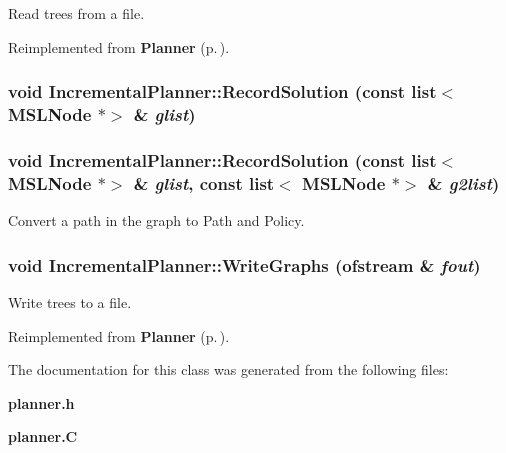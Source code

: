 Read trees from a file.



Reimplemented from {\bf Planner} {\rm (p.\,\pageref{classPlanner_a6})}.
\subsubsection{\setlength{\rightskip}{0pt plus 5cm}void Incremental\-Planner::Record\-Solution (const {\bf list}$<$ {\bf MSLNode} $\ast$$>$ \& {\em glist})}\label{classIncrementalPlanner_a4}


\subsubsection{\setlength{\rightskip}{0pt plus 5cm}void Incremental\-Planner::Record\-Solution (const {\bf list}$<$ {\bf MSLNode} $\ast$$>$ \& {\em glist}, const {\bf list}$<$ {\bf MSLNode} $\ast$$>$ \& {\em g2list})}\label{classIncrementalPlanner_a3}


Convert a path in the graph to Path and Policy.

\subsubsection{\setlength{\rightskip}{0pt plus 5cm}void Incremental\-Planner::Write\-Graphs (ofstream \& {\em fout})\hspace{0.3cm}{\tt  [virtual]}}\label{classIncrementalPlanner_a5}


Write trees to a file.



Reimplemented from {\bf Planner} {\rm (p.\,\pageref{classPlanner_a5})}.

The documentation for this class was generated from the following files:\begin{CompactItemize}
\item 
{\bf planner.h}\item 
{\bf planner.C}\end{CompactItemize}

